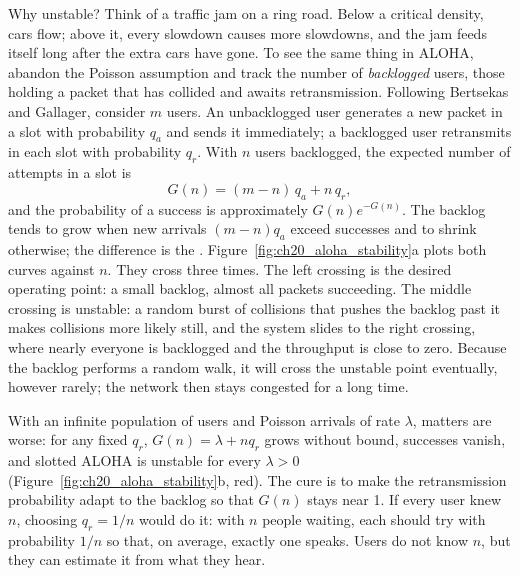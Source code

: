 Why unstable? Think of a traffic jam on a ring road. Below a critical density, cars flow; above it, every
slowdown causes more slowdowns, and the jam feeds itself long after the extra cars have gone. To see the
same thing in ALOHA, abandon the Poisson assumption and track the number of \emph{backlogged} users,
those holding a packet that has collided and awaits retransmission. Following Bertsekas and Gallager,
consider $m$ users. An unbacklogged user generates a new packet in a slot with probability $q_a$ and
sends it immediately; a backlogged user retransmits in each slot with probability $q_r$. With $n$ users
backlogged, the expected number of attempts in a slot is
\begin{equation}
G(n)=(m-n)\,q_a+n\,q_r,
\end{equation}
and the probability of a success is approximately $G(n)e^{-G(n)}$. The backlog tends to grow when new
arrivals $(m-n)q_a$ exceed successes and to shrink otherwise; the difference is the .
Figure~\ref{fig:ch20_aloha_stability}a plots both curves against $n$. They cross three times. The left
crossing is the desired operating point: a small backlog, almost all packets succeeding. The middle
crossing is unstable: a random burst of collisions that pushes the backlog past it makes collisions more
likely still, and the system slides to the right crossing, where nearly everyone is backlogged and the
throughput is close to zero. Because the backlog performs a random walk, it will cross the unstable point
eventually, however rarely; the network then stays congested for a long time.


With an infinite population of users and Poisson arrivals of rate $\lambda$, matters are worse: for any
fixed $q_r$, $G(n)=\lambda+nq_r$ grows without bound, successes vanish, and slotted ALOHA is unstable for
every $\lambda>0$ (Figure~\ref{fig:ch20_aloha_stability}b, red). The cure is to make the retransmission
probability adapt to the backlog so that $G(n)$ stays near 1. If every user knew $n$, choosing
$q_r=1/n$ would do it: with $n$ people waiting, each should try with probability $1/n$ so that, on
average, exactly one speaks. Users do not know $n$, but they can estimate it from what they hear.

